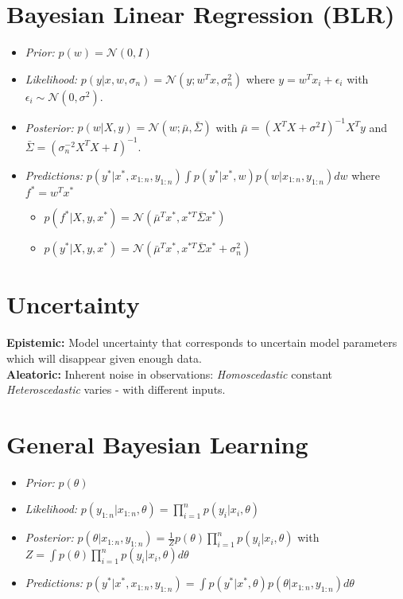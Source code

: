 \documentclass[11pt]{article}
\newcommand{\gauss}{\mathcal{N}}
\begin{document}
	
	\begin{multicols*}{3}
	\section*{Bayesian Linear Regression (BLR)}
	\begin{itemize}
		\item \textit{Prior:} $p(w) = \gauss (0,I)$
\item \textit{Likelihood:} $p(y|x,w,\sigma_n) = \gauss (y;w^Tx,\sigma^2_{n})$ where $y = w^Tx_i + \epsilon_i$ with $\epsilon_i \sim \gauss(0,\sigma^2)$.
\item \textit{Posterior:} $p(w|X,y) = \gauss(w;\bar{\mu},\bar{\Sigma})$ with $\bar{\mu} = (X^TX + \sigma^2 I )^{-1}X^Ty$ and $\bar{\Sigma} = (\sigma_n^{-2}X^T X + I)^{-1}$.
\item \textit{Predictions:} $ p(y^* | x^*, x_{1:n}, y_{1:n}) \int p(y^*|x^*, w) p(w | x_{1:n}, y_{1:n}) dw$ where $f^* = w^T x^*$
\begin{itemize}
	\item $p(f^*| X,y,x^*) = \gauss(\bar{\mu}^T x^*, x^{*T}\bar{\Sigma} x^*)$
	\item $p(y^*| X,y,x^*) = \gauss(\bar{\mu}^T x^*, x^{*T}\bar{\Sigma} x^* + \sigma_n^2)$
\end{itemize}
	\end{itemize}
	
\section*{Uncertainty}
\textbf{Epistemic:} Model uncertainty that corresponds to uncertain model parameters which will disappear given enough data.\\
\textbf{Aleatoric:} Inherent noise in observations: \textit{Homoscedastic} constant \textit{Heteroscedastic} varies - with different inputs.

	
	\section*{General Bayesian Learning}
	\begin{itemize}
		\item \textit{Prior:} $p(\theta)$
		\item \textit{Likelihood:} $p(y_{1:n}| x_{1:n}, \theta) = \prod_{i=1}^{n} p(y_i | x_i, \theta)$
		\item \textit{Posterior:} $p(\theta | x_{1:n}, y_{1:n}) = \frac{1}{Z} p(\theta) \prod_{i=1}^{n} p(y_i | x_i, \theta)$ with $Z = \int p(\theta) \prod_{i=1}^{n} p(y_i | x_i, \theta) d\theta$
		\item \textit{Predictions:} $p(y^* | x^*, x_{1:n}, y_{1:n}) = \int p(y^*|x^*, \theta)p(\theta | x_{1:n}, y_{1:n}) d\theta$
	\end{itemize}
	

\end{multicols*}
\end{document}
